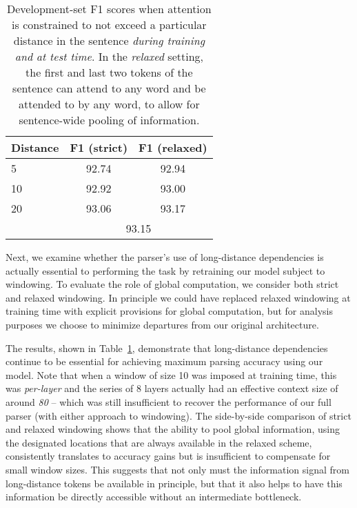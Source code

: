 \documentclass[11pt,a4paper]{article}
\begin{document}
\begin{table}[t!]
\begin{center}
\begin{tabular}{@{}lcc@{}}
\toprule
Distance & \phantom{a}F1 (strict)\phantom{a} & F1 (relaxed) \\
\midrule
5  & 92.74 & 92.94 \\
10 & 92.92 & 93.00 \\
20 & 93.06 & 93.17 \\
 & \multicolumn{2}{c}{93.15} \\
\bottomrule
\end{tabular}
\end{center}
\caption{
\label{table:distance-newtrained}
Development-set F1 scores when attention is constrained to not exceed a particular distance in the sentence \emph{during training and at test time}. In the \emph{relaxed} setting, the first and last two tokens of the sentence can attend to any word and be attended to by any word, to allow for sentence-wide pooling of information.
}
\end{table}

Next, we examine whether the parser's use of long-distance dependencies is actually essential to performing the task by retraining our model subject to windowing. To evaluate the role of global computation, we consider both strict and relaxed windowing. In principle we could have replaced relaxed windowing at training time with explicit provisions for global computation, but for analysis purposes we choose to minimize departures from our original architecture.

The results, shown in Table~\ref{table:distance-newtrained}, demonstrate that long-distance dependencies continue to be essential for achieving maximum parsing accuracy using our model. Note that when a window of size 10 was imposed at training time, this was \emph{per-layer} and the series of 8 layers actually had an effective context size of around \emph{80} -- which was still insufficient to recover the performance of our full parser (with either approach to windowing). The side-by-side comparison of strict and relaxed windowing shows that the ability to pool global information, using the designated locations that are always available in the relaxed scheme, consistently translates to accuracy gains but is insufficient to compensate for small window sizes. This suggests that not only must the information signal from long-distance tokens be available in principle, but that it also helps to have this information be directly accessible without an intermediate bottleneck.
\end{document}
